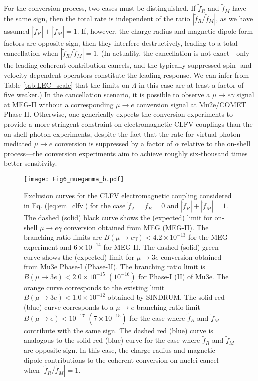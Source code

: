 \documentclass[12pt,letterpaper]{book}
\begin{document}
For the conversion process, two cases must be distinguished. If $\tilde{f}_R$ and $\tilde{f}_M$ have the same sign, then the total rate is independent of the ratio $|\tilde{f}_R/\tilde{f}_M|$, as we have assumed $|\tilde{f}_R|+|\tilde{f}_M|=1$. If, however, the charge radius and magnetic dipole form factors are opposite sign, then they interfere destructively, leading to a total cancellation when $|\tilde{f}_R/\tilde{f}_M|=1$. (In actuality, the cancellation is not exact---only the leading coherent contribution cancels, and the typically suppressed spin- and velocity-dependent operators constitute the leading response. We can infer from Table \ref{tab:LEC_scale} that the limits on $\Lambda$ in this case are at least a factor of five weaker.) In the cancellation scenario, it is possible to observe a $\mu\rightarrow e\gamma$ signal at MEG-II without a corresponding $\mu\rightarrow e$ conversion signal at Mu2e/COMET Phase-II. Otherwise, one generically expects the conversion experiments to provide a more stringent constraint on electromagnetic CLFV couplings than the on-shell photon experiments, despite the fact that the rate for virtual-photon-mediated $\mu\rightarrow e$ conversion is suppressed by a factor of $\alpha$ relative to the on-shell process---the conversion experiments aim to achieve roughly six-thousand times better sensitivity.

\begin{figure}
\centering
\texttt{[image: Fig6\_muegamma\_b.pdf]}
\caption{Exclusion curves for the CLFV electromagnetic coupling considered in Eq. (\ref{eq:em_clfv}) for the case $\tilde{f}_A=\tilde{f}_E=0$ and $|\tilde{f}_R|+|\tilde{f}_M|=1$. The dashed (solid) black curve shows the (expected) limit for on-shell $\mu\rightarrow e\gamma$ conversion obtained from MEG (MEG-II). The branching ratio limits are $B(\mu\rightarrow e\gamma)<4.2\times 10^{-13}$ for the MEG experiment and $6\times 10^{-14}$ for MEG-II. The dashed (solid) green curve shows the (expected) limit for $\mu\rightarrow 3e$ conversion obtained from Mu3e Phase-I (Phase-II). The branching ratio limit is $B(\mu\rightarrow 3e)<2.0\times 10^{-15}$ $(10^{-16})$ for Phase-I (II)  of Mu3e. The orange curve corresponds to the existing limit $B(\mu\rightarrow 3e)<1.0\times 10^{-12}$ obtained by SINDRUM. The solid red (blue) curve corresponds to a $\mu\rightarrow e$ branching ratio limit $B(\mu\rightarrow e)<10^{-17}$ $(7\times 10^{-15})$ for the case where $\tilde{f}_R$ and $\tilde{f}_M$ contribute with the same sign. The dashed red (blue) curve is analogous to the solid red (blue) curve for the case where $\tilde{f}_R$ and $\tilde{f}_M$ are opposite sign. In this case, the charge radius and magnetic dipole contributions to the coherent conversion on nuclei cancel when $|\tilde{f}_R/\tilde{f}_M|=1$.}
\label{fig:mu2e_meg_mu3e}
\end{figure}
\end{document}
